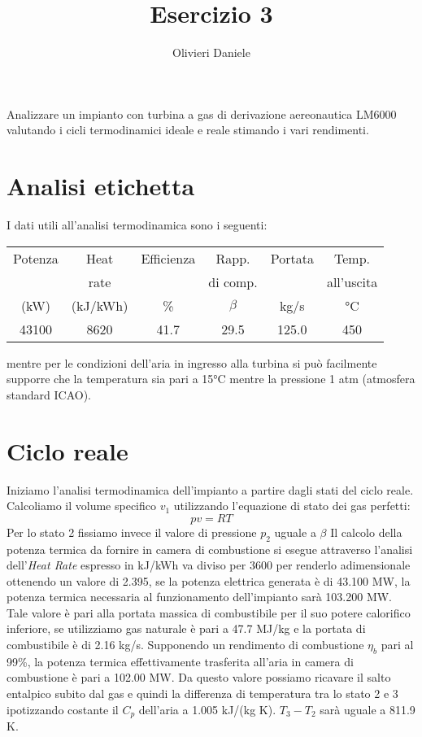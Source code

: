 \documentclass[a4paper,12pt]{article}
\title{Esercizio 3}
\author{Olivieri Daniele}
\date{}
\begin{document}
\maketitle

Analizzare un impianto con turbina a gas di derivazione aereonautica LM6000 valutando i cicli termodinamici ideale e reale stimando i vari rendimenti.
\section{Analisi etichetta}
\label{sec:analisi_etichetta}
I dati utili all'analisi termodinamica sono i seguenti:
\begin{center}
    \begin{tabular}{cccccc}
         Potenza   & Heat  & Efficienza   & Rapp.  & Portata    &  Temp. \\
                   &rate  &              & di comp. &    &        all'uscita \\
            (kW)   &  (kJ/kWh) & \%    &    $\beta$  &   kg/s      &  °C \\ \hline
        43100    &  8620    &  41.7   &  29.5  &     125.0        &  450
    \end{tabular}
\end{center}
mentre per le condizioni dell'aria in ingresso alla turbina si può facilmente supporre che la temperatura sia pari a 15°C mentre la pressione 1 atm
(atmosfera standard ICAO).

\section{Ciclo reale}
\label{sec:ciclo_reale}
Iniziamo l'analisi termodinamica dell'impianto a partire dagli stati del ciclo reale.
Calcoliamo il volume specifico $v_1$ utilizzando l'equazione di stato dei gas perfetti:
\begin{equation}
    \label{eq:gas_perfetti}
    pv = RT
\end{equation}
Per lo stato 2 fissiamo invece il valore di pressione $p_2$ uguale a $\beta$
Il calcolo della potenza termica da fornire in camera di combustione si esegue attraverso l'analisi dell'\textit{Heat Rate} espresso in kJ/kWh va diviso per 3600 per renderlo
adimensionale ottenendo un valore di 2.395, se la potenza elettrica generata è di 43.100 MW, la potenza termica necessaria al funzionamento dell'impianto sarà 103.200 MW.
Tale valore è pari alla portata massica di combustibile per il suo potere calorifico inferiore, se utilizziamo gas naturale è pari a 47.7 MJ/kg e la portata di combustibile
è di 2.16 kg/s.
Supponendo un rendimento di combustione $\eta_b$ pari al 99\%, la potenza termica effettivamente trasferita all'aria in camera di combustione è pari a
102.00 MW. Da questo valore possiamo ricavare il salto entalpico subito dal gas e quindi la differenza di temperatura tra lo stato 2 e 3 ipotizzando costante il $C_p$
dell'aria a 1.005 kJ/(kg K).
$T_3 -T_2$ sarà uguale a 811.9 K.
\end{document}
